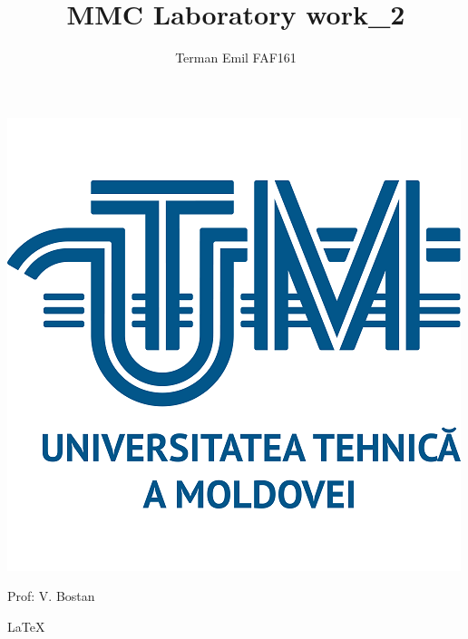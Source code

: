\documentclass{article}
\begin{document}
		\makeatletter
		\newenvironment{sqcases} {
			\matrix@check\sqcases\env@sqcases
		}{
			\endarray \right.
		}
		\def\env@sqcases {
			\let \@ifnextchar \new@ifnextchar
			\left \lbrack
			\def \arraystretch{1.2}
			\array{@{}l@{\quad}l@{}}
		}
		\makeatother

		\newcommand\hr{\par\vspace{-.5\ht\strutbox}\noindent\hrulefill\par}


	\title{MMC Laboratory work\_2}
	\author{Terman Emil FAF161}
	\maketitle
	
	\begin{center}
	\includegraphics{imgs/UTM_logo.png}
	\end{center}
	\begin{flushright}
		Prof: V. Bostan
	\end{flushright}
	\begin{center}
	\LaTeX
	\end{center}
	\pagebreak %
	
\end{document}

